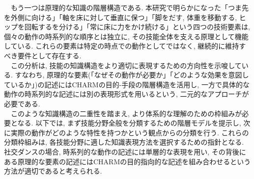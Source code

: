 　もう一つは原理的な知識の階層構造である. 本研究で明らかになった「つま先を外側に向ける」「軸を床に対して垂直に保つ」「脚をだす, 体重を移動する, ヒップを回転するを分ける」「常に床に力をかけ続ける」という四つの技術要素は, 個々の動作の時系列的な順序とは独立に, その技能全体を支える原理として機能している. これらの要素は特定の時点での動作としてではなく, 継続的に維持すべき要件として存在する. \\
　この分析は, 技能の知識構造をより適切に表現するための方向性を示唆している. すなわち, 原理的な要素(「なぜその動作が必要か」「どのような効果を意図しているか」)の記述にはCHARMの目的-手段の階層構造を活用し, 一方で具体的な動作の時系列的な記述には別の表現形式を用いるという, 二元的なアプローチが必要である. \\
　このような知識構造の二重性を踏まえ, より体系的な理解のための枠組みが必要となる. 以下では, まず技能分野全般を分類するための階層モデルを提示し, 次に実際の動作がどのような特性を持つかという観点からの分類を行う. これらの分類枠組みは, 各技能分野に適した知識表現方法を選択するための指針となる. 社交ダンスの場合, 時系列的な動作の記述には単層的な表現を用い, その背後にある原理的な要素の記述にはCHARMの目的指向的な記述を組み合わせるという方法が適切であると考えられる. \\


